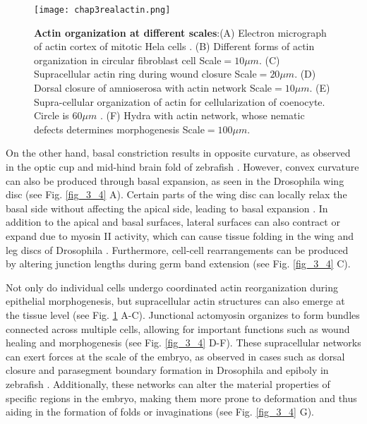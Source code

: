 \begin{figure}
	\centering
	\texttt{[image: chap3realactin.png]}
	\caption{\label{fig_3_3} \textbf{Actin organization at different scales}:(A) Electron micrograph of actin cortex of mitotic Hela cells \cite{kelkar2020}. (B) Different forms of actin organization in circular fibroblast cell \cite{jalal2019} Scale$= 10\mu m$. (C) Supracellular actin ring during wound closure \cite{brugues2014} Scale$=20 \mu m$. (D) Dorsal closure of amnioserosa with actin network \cite{ducuing2016} Scale$= 10 \mu m$. (E) Supra-cellular organization of actin for cellularization of coenocyte. Circle is $60 \mu m$ \cite{dudin2019}. (F) Hydra with actin network, whose nematic defects determines morphogenesis \cite{maroudas-sacks2021} Scale$= 100 \mu m$.
	}
\end{figure}

On the other hand, basal constriction results in opposite curvature, as observed in the optic cup and mid-hind brain fold of zebrafish \cite{sidhaye2017, gutzman2018}. However, convex curvature can also be produced through basal expansion, as seen in the Drosophila wing disc (see Fig. \ref{fig_3_4} A). Certain parts of the wing disc can locally relax the basal side without affecting the apical side, leading to basal expansion \cite{sui2018}. In addition to the apical and basal surfaces, lateral surfaces can also contract or expand due to myosin II activity, which can cause tissue folding in the wing and leg discs of Drosophila \cite{sui2018, monier2015}. Furthermore, cell-cell rearrangements can be produced by altering junction lengths during germ band extension \cite{yu2016, collinet2015} (see Fig. \ref{fig_3_4} C). 

Not only do individual cells undergo coordinated actin reorganization during epithelial morphogenesis, but supracellular actin structures can also emerge at the tissue level (see Fig. \ref{fig_3_3} A-C). Junctional actomyosin organizes to form bundles connected across multiple cells, allowing for important functions such as wound healing and morphogenesis \cite{brugues2014, clarke2021} (see Fig. \ref{fig_3_4} D-F). These supracellular networks can exert forces at the scale of the embryo, as observed in cases such as dorsal closure and parasegment boundary formation in Drosophila and epiboly in zebrafish \cite{ducuing2016, calzolari2014}. Additionally, these networks can alter the material properties of specific regions in the embryo, making them more prone to deformation and thus aiding in the formation of folds or invaginations (see Fig. \ref{fig_3_4} G). 

